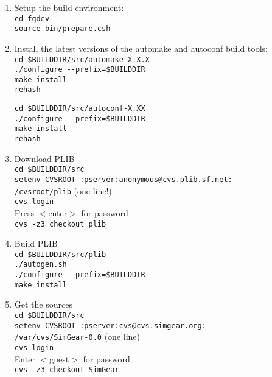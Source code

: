 \begin{enumerate}
\item Setup the build environment:\\
 \texttt{cd fgdev}\\
 \texttt{source bin/prepare.csh}

\item Install the latest versions of the automake and autoconf build tools:\\
 \texttt{cd {\$}BUILDDIR/src/automake-X.X.X}\\
 \texttt{./configure -$ $-prefix={\$}BUILDDIR}\\
 \texttt{make install}\\
  \texttt{rehash}
  
 \texttt{cd {\$}BUILDDIR/src/autoconf-X.XX}\\
 \texttt{./configure -$ $-prefix={\$}BUILDDIR}\\
 \texttt{make install}\\
  \texttt{rehash}
  
\item Download PLIB\\
 \texttt{cd {\$}BUILDDIR/src} \\
 \texttt{setenv CVSROOT :pserver:anonymous@cvs.plib.sf.net:}\\
 \texttt{/cvsroot/plib} (one line!)\\
 \texttt{cvs login}\\
 Press $<$enter$>$ for password\\
 \texttt{cvs -z3 checkout plib} 

\item Build PLIB\\
 \texttt{cd {\$}BUILDDIR/src/plib}\\
 \texttt{./autogen.sh}\\
  \texttt{./configure -$ $-prefix={\$}BUILDDIR}\\
 \texttt{make install}

\item Get the \SimGear{} sources\\
 \texttt{cd {\$}BUILDDIR/src}\\
 \texttt{setenv CVSROOT :pserver:cvs@cvs.simgear.org:}\\
 \texttt{/var/cvs/SimGear-0.0} (one line)\\
 \texttt{cvs login}\\
 Enter $<$guest$>$ for password\\
 \texttt{cvs -z3 checkout SimGear}\\


\end{enumerate}

